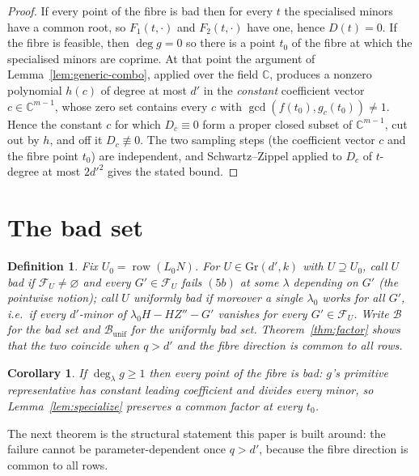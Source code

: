 \documentclass[journal]{IEEEtran}
\theoremstyle{plainn}
\newtheorem{cor}[thm]{Corollary}
\newtheorem{defn}[thm]{Definition}
\theoremstyle{remark}
\begin{document}
\begin{proof}
If every point of the fibre is bad then for every $t$ the specialised minors have a common root, so
$F_1(t,\cdot)$ and $F_2(t,\cdot)$ have one, hence $D(t)=0$. If the fibre is feasible, then $\deg g=0$
so there is a point $t_0$ of the fibre at which the specialised minors are coprime. At that point the
argument of Lemma~\ref{lem:generic-combo}, applied over the field $\mathbb C$, produces a nonzero
polynomial $h(c)$ of degree at most $d'$ in the \emph{constant} coefficient vector $c\in\mathbb C^{m-1}$,
whose zero set contains every $c$ with $\gcd(f(t_0),g_c(t_0))\ne1$. Hence the constant $c$ for which
$D_c\equiv0$ form a proper closed subset of $\mathbb C^{m-1}$, cut out by $h$, and off it
$D_c\not\equiv0$. The two sampling steps (the coefficient vector $c$ and the fibre point $t_0$) are
independent, and Schwartz--Zippel applied to $D_c$ of $t$-degree at most $2d'^{2}$ gives the stated
bound.
\end{proof}

\section{The bad set}\label{sec:bad}

\begin{defn}\label{def:bad}
Fix $U_0=\operatorname{row}(L_0N)$. For $U\in\mathrm{Gr}(d',k)$ with $U\supseteq U_0$, call $U$
\emph{bad} if $\mathcal F_U\ne\varnothing$ and every $G'\in\mathcal F_U$ fails $(5b)$ at some $\lambda$
depending on $G'$ (the pointwise notion); call $U$ \emph{uniformly bad} if moreover a single $\lambda_0$
works for all $G'$, i.e.\ if every $d'$-minor of $\lambda_0H-HZ''-G'$ vanishes for every
$G'\in\mathcal F_U$. Write $\mathcal B$ for the bad set and $\mathcal B_{\mathrm{unif}}$ for the uniformly
bad set. Theorem~\ref{thm:factor} shows that the two coincide when $q>d'$ and the fibre direction is
common to all rows.
\end{defn}

\begin{cor}\label{cor:every-bad}
If $\deg_\lambda g\ge1$ then every point of the fibre is bad: $g$'s primitive representative has
constant leading coefficient and divides every minor, so Lemma~\ref{lem:specialize} preserves a
common factor at every $t_0$.
\end{cor}

The next theorem is the structural statement this paper is built around: the failure cannot be
parameter-dependent once $q>d'$, because the fibre direction is common to all rows.
\end{document}
